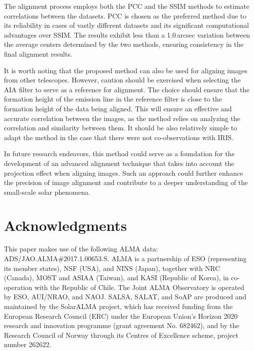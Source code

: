 \documentclass[a4paper,alpha-refs]{eSpectra}
\begin{document}
The alignment process employs both the PCC and the SSIM methods to estimate correlations between the datasets. PCC is chosen as the preferred method due to its reliability in cases of vastly different datasets and its significant computational advantages over SSIM. The results exhibit less than a 1.0\,arcsec variation between the average centers determined by the two methods, ensuring consistency in the final alignment results.


It is worth noting that the proposed method can also be used for aligning images from other telescopes. However, caution should be exercised when selecting the AIA filter to serve as a reference for alignment. The choice should ensure that the formation height of the emission line in the reference filter is close to the formation height of the data being aligned. This will ensure an effective and accurate correlation between the images, as the method relies on analyzing the correlation and similarity between them. It should be also relatively simple to adapt the method in the case that there were not co-observations with IRIS.

In future research endeavors, this method could serve as a foundation for the development of an advanced alignment technique that takes into account the projection effect when aligning images. Such an approach could further enhance the precision of image alignment and contribute to a deeper understanding of the small-scale solar phenomena.







\section*{Acknowledgments}
This paper makes use of the following ALMA data: ADS/JAO.ALMA\#2017.1.00653.S. ALMA is a partnership of ESO (representing its member states), NSF (USA), and NINS (Japan), together with NRC (Canada), MOST and ASIAA (Taiwan), and KASI (Republic of Korea), in co-operation with the Republic of Chile. The Joint ALMA Observatory is operated by ESO, AUI/NRAO, and NAOJ. SALSA, SALAT, and SoAP are produced and maintained by the SolarALMA project, which has received funding from the European Research Council (ERC) under the European Union's Horizon 2020 research and innovation programme (grant agreement No. 682462), and by the Research Council of Norway through its Centres of Excellence scheme, project number 262622.
\end{document}
